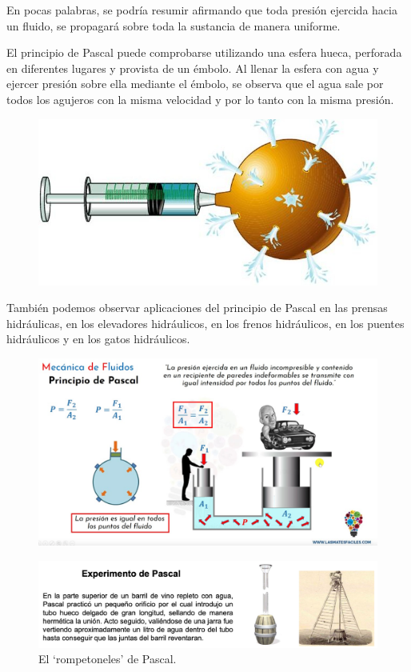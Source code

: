En pocas palabras, se podría resumir afirmando que toda presión 
ejercida hacia un fluido, se propagará sobre toda la sustancia de 
manera uniforme. 
\begin{multicols}{2}
El principio de Pascal puede comprobarse utilizando una esfera hueca, perforada en diferentes lugares y provista de un émbolo. Al llenar la esfera con agua y ejercer presión sobre ella mediante el émbolo, se observa que el agua sale por todos los agujeros con la misma velocidad y por lo tanto con la misma presión.
\begin{figure}[H]
	\centering
	\includegraphics[width=.4\textwidth]{imagenes/imagenes07/T07IM06.png}
\end{figure}
\end{multicols}
También podemos observar aplicaciones del principio de Pascal en las prensas hidráulicas, en los elevadores hidráulicos, en los frenos hidráulicos, en los puentes hidráulicos y en los gatos hidráulicos.

\begin{figure}[H]
	\centering
	\includegraphics[width=1\textwidth]{imagenes/imagenes07/T07IM07.png}
\end{figure}

\begin{figure}[H]
	\centering
	\includegraphics[width=1\textwidth]{imagenes/imagenes07/T07IM15.png}
	\caption*{El `rompetoneles' de Pascal.}
\end{figure}

